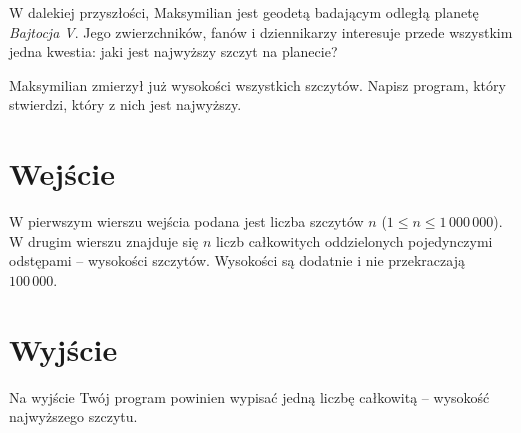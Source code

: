 \documentclass{spiral-kurs}
\begin{document}
  \makeheader
      W dalekiej przyszłości, Maksymilian jest geodetą badającym odległą planetę \emph{Bajtocja V}. Jego zwierzchników, fanów i dziennikarzy interesuje przede wszystkim jedna kwestia: jaki jest najwyższy szczyt na planecie?

      Maksymilian zmierzył już wysokości wszystkich szczytów. Napisz program, który stwierdzi, który z nich jest najwyższy.


  \section{Wejście}
      W pierwszym wierszu wejścia podana jest liczba szczytów $n$ ($1 \leq n \leq 1\,000\,000$). W drugim wierszu znajduje się $n$ liczb całkowitych oddzielonych pojedynczymi odstępami -- wysokości szczytów. Wysokości są dodatnie i nie przekraczają $100\,000$.


  \section{Wyjście}
      Na wyjście Twój program powinien wypisać jedną liczbę całkowitą -- wysokość najwyższego szczytu.


%
%
%
%
\end{document}
